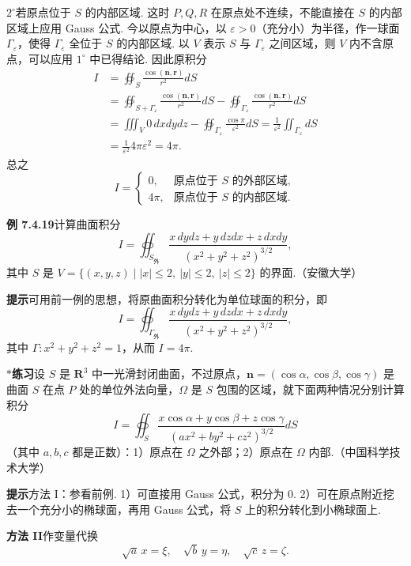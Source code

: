 \documentclass[UTF8,12pt,a4paper,fontset=fandol]{ctexart}
\begin{document}
\noindent\textbf{$2^\circ$}\quad 若原点位于 $S$ 的内部区域. 这时 $P,Q,R$ 在原点处不连续，不能直接在 $S$ 的内部区域上应用 Gauss 公式. 今以原点为中心，以 $\varepsilon>0$（充分小）为半径，作一球面 $\Gamma_\varepsilon$，使得 $\Gamma_\varepsilon$ 全位于 $S$ 的内部区域. 以 $V$ 表示 $S$ 与 $\Gamma_\varepsilon$ 之间区域，则 $V$ 内不含原点，可以应用 $1^\circ$ 中已得结论. 因此原积分
\[
\begin{aligned}
I&=\oiint_S\frac{\cos(\mathbf n,\mathbf r)}{r^2}dS\\
&=\oiint_{S+\Gamma_\varepsilon}\frac{\cos(\mathbf n,\mathbf r)}{r^2}dS
-\oiint_{\Gamma_\varepsilon}\frac{\cos(\mathbf n,\mathbf r)}{r^2}dS\\
&=\iiint_V0\,dxdydz-\oiint_{\Gamma_\varepsilon}\frac{\cos\pi}{\varepsilon^2}dS
=\frac1{\varepsilon^2}\iint_{\Gamma_\varepsilon}dS\\
&=\frac1{\varepsilon^2}4\pi\varepsilon^2=4\pi.
\end{aligned}
\]
总之
\[
I=\begin{cases}
0, & \text{原点位于 $S$ 的外部区域},\\
4\pi, & \text{原点位于 $S$ 的内部区域}.
\end{cases}
\]

\noindent\textbf{例 7.4.19}\quad 计算曲面积分
\[
I=\oiint_{S_{\text{外}}}\frac{x\,dydz+y\,dzdx+z\,dxdy}{(x^2+y^2+z^2)^{3/2}},
\]
其中 $S$ 是 $V=\{(x,y,z)\mid |x|\le2,\ |y|\le2,\ |z|\le2\}$ 的界面.（安徽大学）

\noindent\textbf{提示}\quad 可用前一例的思想，将原曲面积分转化为单位球面的积分，即
\[
I=\oiint_{\Gamma_{\text{外}}}\frac{x\,dydz+y\,dzdx+z\,dxdy}{(x^2+y^2+z^2)^{3/2}},
\]
其中 $\Gamma:x^2+y^2+z^2=1$，从而 $I=4\pi$.

\noindent\textbf{$*$练习}\quad 设 $S$ 是 $\mathbf R^3$ 中一光滑封闭曲面，不过原点，$\mathbf n=(\cos\alpha,\cos\beta,\cos\gamma)$ 是曲面 $S$ 在点 $P$ 处的单位外法向量，$\Omega$ 是 $S$ 包围的区域，就下面两种情况分别计算积分
\[
I=\oiint_S\frac{x\cos\alpha+y\cos\beta+z\cos\gamma}{(ax^2+by^2+cz^2)^{3/2}}dS \tag{1}
\]
（其中 $a,b,c$ 都是正数）：1）原点在 $\Omega$ 之外部；2）原点在 $\Omega$ 内部.（中国科学技术大学）

\noindent\textbf{提示}\quad 方法 I：参看前例. 1）可直接用 Gauss 公式，积分为 0. 2）可在原点附近挖去一个充分小的椭球面，再用 Gauss 公式，将 $S$ 上的积分转化到小椭球面上.

\noindent\textbf{方法 II}\quad 作变量代换
\[
\sqrt a\,x=\xi,\quad \sqrt b\,y=\eta,\quad \sqrt c\,z=\zeta.
\]
\end{document}
